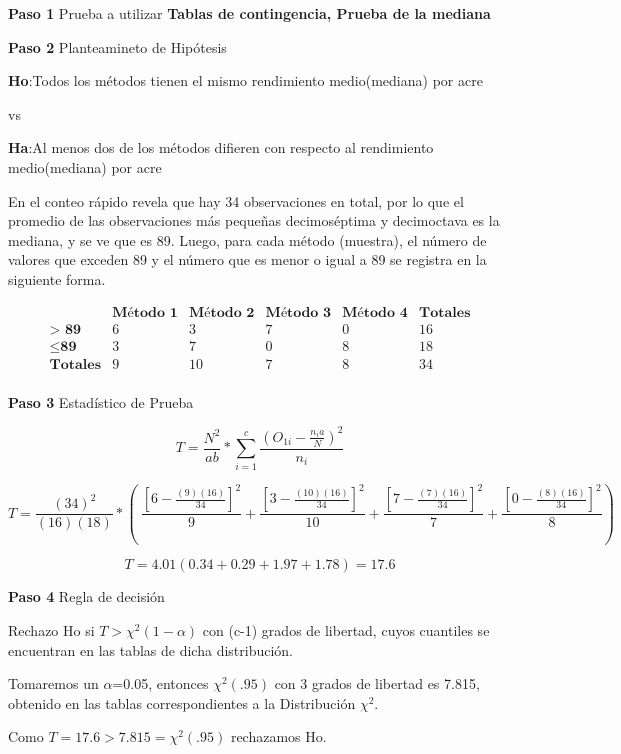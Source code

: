 \documentclass[a4paper,oneside,openany]{book}
\begin{document}
\textbf{Paso 1} Prueba a utilizar \textbf{Tablas de contingencia, Prueba
de la mediana}

\textbf{Paso 2} Planteamineto de Hipótesis

\textbf{Ho}:Todos los métodos tienen el mismo rendimiento medio(mediana)
por acre

vs

\textbf{Ha}:Al menos dos de los métodos difieren con respecto al
rendimiento medio(mediana) por acre

En el conteo rápido revela que hay 34 observaciones en total, por lo que
el promedio de las observaciones más pequeñas decimoséptima y
decimoctava es la mediana, y se ve que es 89. Luego, para cada método
(muestra), el número de valores que exceden 89 y el número que es menor
o igual a 89 se registra en la siguiente forma.

\[
\begin{equation*}
\begin{array}{c|c|c|c|c|c}
 & \textbf{Método 1} & \textbf{Método 2} & \textbf{Método 3} & \textbf{Método 4}& \textbf{Totales} \\
\hline
\textbf{> 89} & 6 & 3 & 7 & 0 & 16  \\
\hline
\leq \textbf{89} & 3 & 7 & 0 & 8 & 18\\
\hline
\textbf{Totales}  & 9  & 10  & 7 & 8  & 34 \\
\end{array}
\end{equation*}
\]

\textbf{Paso 3} Estadístico de Prueba

\[T=\frac{N^2}{ab}*\sum^{c}_{i=1}\frac{(O_{1i}-\frac{n_{i}a}{N})^2}{n_i}\]

\[T=\frac{(34)^2}{(16)(18)}*\left(\ \frac{\left[6-\frac{(9)(16)}{34}\right]^2}{9}+\frac{\left[3-\frac{(10)(16)}{34}\right]^2}{10}+\frac{\left[7-\frac{(7)(16)}{34}\right]^2}{7}+\frac{\left[0-\frac{(8)(16)}{34}\right]^2}{8} \right)\]

\[T=4.01(0.34+0.29+1.97+1.78) = 17.6\]

\textbf{Paso 4} Regla de decisión

Rechazo Ho si \(T> \chi^2(1-\alpha)\) con (c-1) grados de libertad,
cuyos cuantiles se encuentran en las tablas de dicha distribución.

Tomaremos un \(\alpha\)=0.05, entonces \(\chi^2(.95)\) con 3 grados de
libertad es 7.815, obtenido en las tablas correspondientes a la
Distribución \(\chi^2\).

Como \(T=17.6 > 7.815=\chi^2(.95)\) rechazamos Ho.
\end{document}
